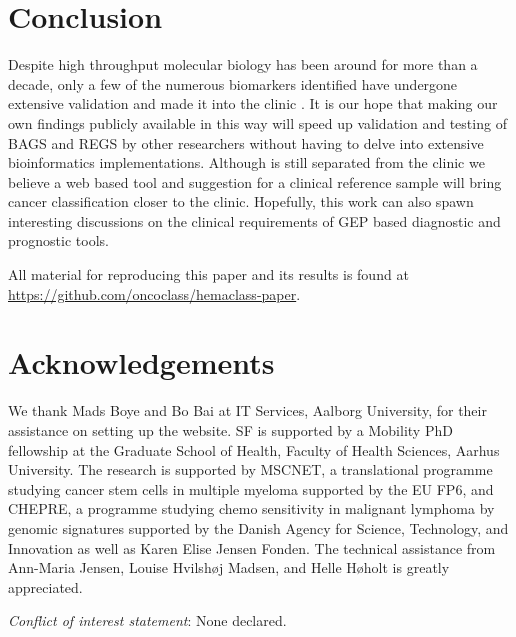 \documentclass{article}
\begin{document}
\section{Conclusion}
Despite high throughput molecular biology has been around for more than a decade, only a few of the numerous biomarkers identified have undergone extensive validation and made it into the clinic \citep{Chen2012a}.
It is our hope that making our own findings publicly available in this way will speed up validation and testing of BAGS and REGS by other researchers without having to delve into extensive bioinformatics implementations.
Although \hemaClass{} is still separated from the clinic we believe a web based tool and suggestion for a clinical reference sample will bring cancer classification closer to the clinic.
Hopefully, this work can also spawn interesting discussions on the clinical requirements of GEP based diagnostic and prognostic tools.

All material for reproducing this paper and its results is found at \url{https://github.com/oncoclass/hemaclass-paper}.

{}
\section*{Acknowledgements}
We thank Mads Boye and Bo Bai at IT Services, Aalborg University, for their assistance on setting up the website.
SF is supported by a Mobility PhD fellowship at the Graduate School of Health, Faculty of Health Sciences, Aarhus University.
The research is supported by MSCNET, a translational programme studying cancer stem cells in multiple myeloma supported by the EU FP6, and CHEPRE, a programme studying chemo sensitivity in malignant lymphoma by genomic signatures supported by the Danish Agency for Science, Technology, and Innovation as well as Karen Elise Jensen Fonden.
The technical assistance from Ann-Maria Jensen, Louise Hvilsh{\o}j Madsen, and Helle H{\o}holt is greatly appreciated.



\noindent\textit{Conflict of interest statement}: None declared.
{}



\renewcommand{\thefigure}{S\arabic{figure}}
\renewcommand{\thetable}{S\arabic{table}}
\end{document}
